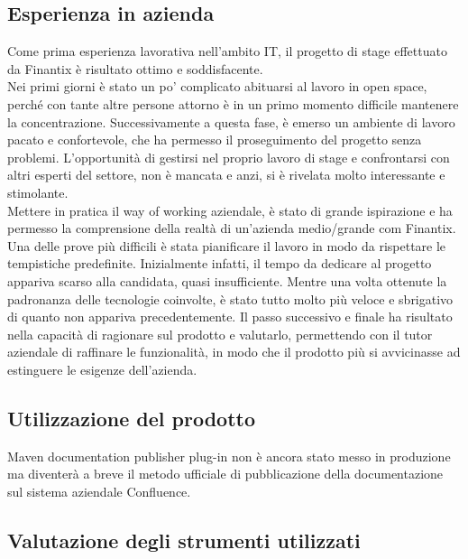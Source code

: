     \subsection{Esperienza in azienda}
    Come prima esperienza lavorativa nell'ambito IT, il progetto di stage effettuato da Finantix è risultato ottimo e soddisfacente. \\
    Nei primi giorni è stato un po' complicato abituarsi al lavoro in open space, perché con tante altre persone attorno è in un primo momento difficile mantenere la concentrazione.
    Successivamente a questa fase, è emerso un ambiente di lavoro pacato e confortevole, che ha permesso il proseguimento del progetto senza problemi.
    L'opportunità di gestirsi nel proprio lavoro di stage e confrontarsi con altri esperti del settore, non è mancata e anzi, si è rivelata molto interessante e stimolante. \\
    Mettere in pratica il way of working aziendale, è stato di grande ispirazione e ha permesso la comprensione della realtà di un'azienda medio/grande com Finantix.
    Una delle prove più difficili è stata pianificare il lavoro in modo da rispettare le tempistiche predefinite.
    Inizialmente infatti, il tempo da dedicare al progetto appariva scarso alla candidata, quasi insufficiente.
    Mentre una volta ottenute la padronanza delle tecnologie coinvolte, è stato tutto molto più veloce e sbrigativo di quanto non appariva precedentemente.
    Il passo successivo e finale ha risultato nella capacità di ragionare sul prodotto e valutarlo, permettendo con il tutor aziendale di raffinare le funzionalità, in modo che il prodotto più si avvicinasse ad estinguere le esigenze dell'azienda.

\subsection{Utilizzazione del prodotto} %
Maven documentation publisher plug-in non è ancora stato messo in produzione ma diventerà a breve il metodo ufficiale di pubblicazione della documentazione sul sistema aziendale Confluence.


\subsection{Valutazione degli strumenti utilizzati}

